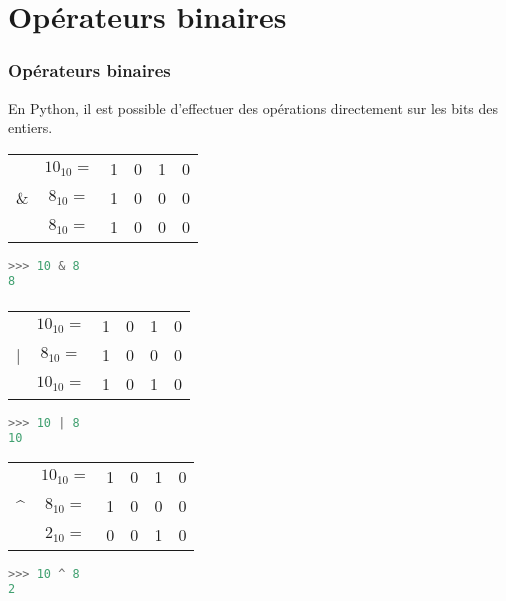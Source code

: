 \documentclass[svgnames,11pt]{beamer}
\begin{document}
\section{Opérateurs binaires}
\begin{frame}[fragile]
    \frametitle{Opérateurs binaires}

En Python, il est possible d'effectuer des opérations directement sur les bits des entiers.
\begin{center}
    \begin{tabular}{*{6}{c}}
        &$10_{10}=$&1&0&1&0\\
        \&&$8_{10}=$&1&0&0&0\\
        \hline
        &$8_{10}=$&1&0&0&0\\
    \end{tabular}
\end{center}
\begin{center}
\begin{lstlisting}[language=Python , basicstyle=\ttfamily\small, xleftmargin=2em, xrightmargin=2em]
>>> 10 & 8
8
\end{lstlisting}
\end{center}
\end{frame}
\begin{frame}[fragile]
    \frametitle{}

\begin{center}
    \begin{tabular}{*{6}{c}}
        &$10_{10}=$&1&0&1&0\\
        |&$8_{10}=$&1&0&0&0\\
        \hline
        &$10_{10}=$&1&0&1&0\\
    \end{tabular}
\end{center}
\begin{center}
\begin{lstlisting}[language=Python , basicstyle=\ttfamily\small, xleftmargin=2em, xrightmargin=2em]
>>> 10 | 8
10
\end{lstlisting}
\end{center}
\begin{center}
    \begin{tabular}{*{6}{c}}
        &$10_{10}=$&1&0&1&0\\
        \^&$8_{10}=$&1&0&0&0\\
        \hline
        &$2_{10}=$&0&0&1&0\\
    \end{tabular}
\end{center}
\begin{center}
\begin{lstlisting}[language=Python , basicstyle=\ttfamily\small, xleftmargin=2em, xrightmargin=2em]
>>> 10 ^ 8
2
\end{lstlisting}
\end{center}
\end{frame}
\end{document}
